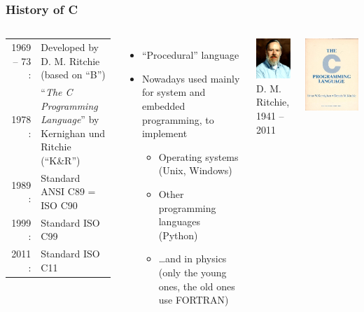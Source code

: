 \documentclass{slides}
\begin{document}
\begin{frame}
  \frametitle{History of C}
  \begin{columns}[c,onlytextwidth]
    \begin{tabular}{r<{:}p{}}
      1969 -- 73 & Developed by D. M. Ritchie (based on ``B'')\\
      1978 & ``\emph{The C Programming Language}'' by Kernighan und Ritchie (``K\&R'')\\
      1989 & Standard ANSI C89 = ISO C90\\
      1999 & Standard ISO C99\\
      2011 & Standard ISO C11
    \end{tabular}

  \begin{itemize}
  \item ``Procedural'' language
  \item Nowadays used mainly for system and embedded programming, \eg
    to implement
    \begin{itemize}
    \item Operating systems (\eg Unix, Windows)
    \item Other programming languages (\eg Python)
    \item \dots and in physics (only the young ones, the old ones use FORTRAN)
    \end{itemize}
  \end{itemize}

    \centering
    \includegraphics[height=0.25\textheight]{ritchie}\\
    {\tiny D. M. Ritchie, 1941 -- 2011}
    \vspace{\baselineskip}

    \includegraphics[height=0.4\textheight]{kr-c}\\
  \end{columns}
\end{frame}
\end{document}
